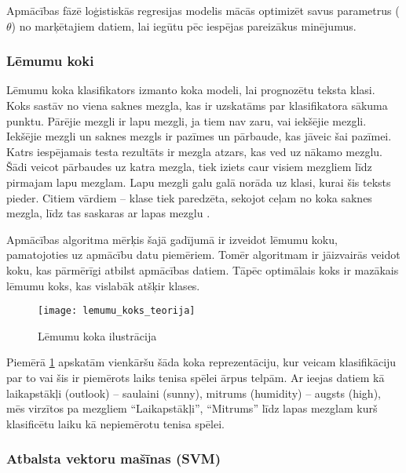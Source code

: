 Apmācības fāzē loģistiskās regresijas modelis mācās optimizēt savus parametrus (\(\theta\)) no marķētajiem datiem, lai iegūtu pēc iespējas pareizākus minējumus.

\subsubsection{Lēmumu koki}

Lēmumu koka klasifikators izmanto koka modeli, lai prognozētu teksta klasi. Koks sastāv no viena saknes mezgla, kas ir uzskatāms par klasifikatora sākuma punktu. Pārējie mezgli ir lapu mezgli, ja tiem nav zaru, vai iekšējie mezgli. Iekšējie mezgli un saknes mezgls ir pazīmes un pārbaude, kas jāveic šai pazīmei. Katrs iespējamais testa rezultāts ir mezgla atzars, kas ved uz nākamo mezglu. Šādi veicot pārbaudes uz katra mezgla, tiek iziets caur visiem mezgliem līdz pirmajam lapu mezglam. Lapu mezgli galu galā norāda uz klasi, kurai šis teksts pieder. Citiem vārdiem – klase tiek paredzēta, sekojot ceļam no koka saknes mezgla, līdz tas saskaras ar lapas mezglu \cite{mitchell1997}. 

Apmācības algoritma mērķis šajā gadījumā ir izveidot lēmumu koku, pamatojoties uz apmācību datu piemēriem. Tomēr algoritmam ir jāizvairās veidot koku, kas pārmērīgi atbilst apmācības datiem. Tāpēc optimālais koks ir mazākais lēmumu koks, kas vislabāk atšķir klases.

\begin{figure}[H]
	\texttt{[image: lemumu\_koks\_teorija]}
	\caption{Lēmumu koka ilustrācija \cite{mitchell1997} }
	\label{fig:lemumu_koks_teorija}
\end{figure}

Piemērā \ref{fig:lemumu_koks_teorija} apskatām vienkāršu šāda koka reprezentāciju, kur veicam klasifikāciju par to vai šis ir piemērots laiks tenisa spēlei ārpus telpām. Ar ieejas datiem kā laikapstākļi (outlook) – saulaini (sunny), mitrums (humidity) – augsts (high), mēs virzītos pa mezgliem “Laikapstākļi”, “Mitrums” līdz lapas mezglam kurš klasificētu laiku kā nepiemērotu tenisa spēlei.

\subsubsection{Atbalsta vektoru mašīnas (SVM)}

